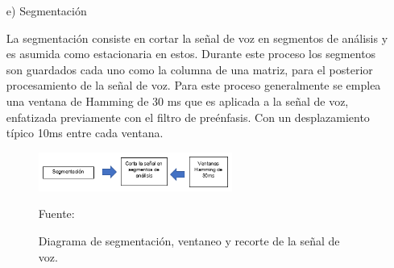 \begin{enumerate}
\item[e)]Segmentación
\par
La segmentación consiste en cortar la señal de voz en segmentos de análisis y es asumida como estacionaria en estos. Durante este proceso los segmentos son guardados cada uno como la columna de una matriz, para el posterior procesamiento de la señal de voz.
\vskip 0.5cm
Para este proceso generalmente se emplea una ventana de Hamming de 30 ms que es aplicada a la señal de voz, enfatizada previamente con el filtro de preénfasis. Con un desplazamiento típico 10ms entre cada ventana.
\begin{figure}[ht]
\begin{center}
\includegraphics[width=0.6\textwidth]{Imagenes/Cap2/image033}
\end{center}
\begin{center}
\vskip -0.5cm
\caption{\small{Diagrama de segmentación, ventaneo y recorte de la señal de voz.}}
\label{fig:figura2.32}
{\small{Fuente: \citep{eyra}}}
\end{center}
\end{figure}


\end{enumerate}
